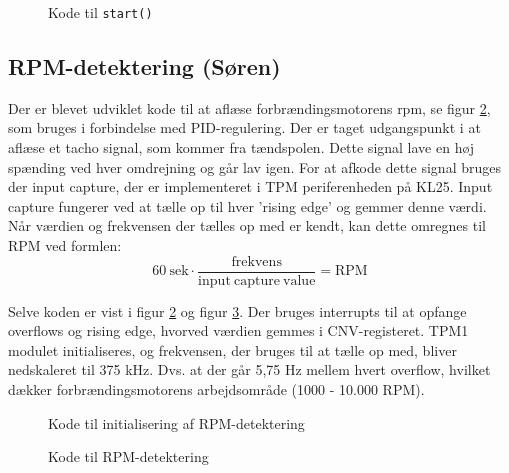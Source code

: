 \begin{figure}[h]
  \centering
  
  \caption{Kode til \lstinline{start()}}
  \label{fig:kodes3}
\end{figure}

\clearpage
\subsection{RPM-detektering (Søren)}
\label{sec:rpm-detektering}

Der er blevet udviklet kode til at aflæse forbrændingsmotorens rpm, se figur \ref{fig:kodes3}, som bruges i forbindelse med PID-regulering. Der er taget udgangspunkt i at aflæse et tacho signal, som kommer fra tændspolen. Dette signal lave en høj spænding ved hver omdrejning og går lav igen. For at afkode dette signal bruges der input capture, der er implementeret i TPM periferenheden på KL25. Input capture fungerer ved at tælle op til hver ’rising edge’ og gemmer denne værdi. Når værdien og frekvensen der tælles op med er kendt, kan dette omregnes til RPM ved formlen:
\begin{equation}
  \label{eq:4}
 60 \mathrm{\ sek} \cdot \frac{\mathrm{frekvens}}{\mathrm{input\ capture\ value}}=\mathrm{RPM} 
\end{equation}

Selve koden er vist i figur \ref{fig:kodes3} og figur \ref{fig:kodes32}. Der bruges interrupts til at opfange overflows og rising edge, hvorved værdien gemmes i CNV-registeret. TPM1 modulet initialiseres, og frekvensen, der bruges til at tælle op med, bliver nedskaleret til 375 kHz. Dvs. at der går 5,75 Hz mellem hvert overflow, hvilket dækker forbrændingsmotorens arbejdsområde (1000 - 10.000 RPM).

\begin{figure}[h]
  \centering
    
  \caption{Kode til initialisering af RPM-detektering}
  \label{fig:kodes3}
\end{figure}
\clearpage
\begin{figure}[h]
  \centering
    
  \caption{Kode til RPM-detektering}
  \label{fig:kodes32}
\end{figure}




